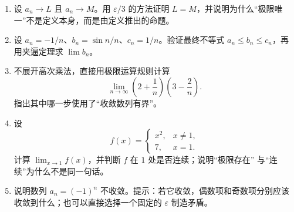 \documentclass[UTF8,fontset=none,a4paper,11pt]{ctexart}
\theoremstyle{foundation-definition}
\theoremstyle{foundation-theorem}
\theoremstyle{foundation-proposition}
\theoremstyle{foundation-example}
\theoremstyle{foundation-remark}
\theoremstyle{foundation-theorem}
\begin{document}
\begin{enumerate}[label=M0.\arabic*.]
    再对 \(g:[0,\infty)\to[0,\infty)\)、\(g(x)=x^2\)，写出其唯一的左逆和右逆。
  \item 设 \(a_n\to L\) 且 \(a_n\to M\)。用 \(\varepsilon/3\) 的方法证明
    \(L=M\)，并说明为什么“极限唯一”不是定义本身，而是由定义推出的命题。
  \item 设 \(a_n=-1/n\)、\(b_n=\sin n/n\)、\(c_n=1/n\)。验证最终不等式
    \(a_n\le b_n\le c_n\)，再用夹逼定理求 \(\lim b_n\)。
  \item 不展开高次乘法，直接用极限运算规则计算
    \[
    \lim_{n\to\infty}\left(2+\frac1n\right)\left(3-\frac2n\right).
    \]
    指出其中哪一步使用了“收敛数列有界”。
  \item 设
    \[
    f(x)=\begin{cases}x^2,&x\ne1,\\ 7,&x=1.\end{cases}
    \]
    计算 \(\lim_{x\to1}f(x)\)，并判断 \(f\) 在 \(1\) 处是否连续；说明“极限存在”
    与“连续”为什么不是同一句话。
  \item 说明数列 \(a_n=(-1)^n\) 不收敛。提示：若它收敛，偶数项和奇数项分别应该
    收敛到什么；也可以直接选择一个固定的 \(\varepsilon\) 制造矛盾。
\end{enumerate}
\end{document}
